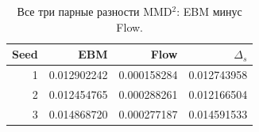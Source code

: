 \begin{table}[H]\centering\small
\setlength{\tabcolsep}{4pt}
\caption{Все три парные разности MMD$^2$: EBM минус Flow.}\label{tab:pairs}
\begin{tabular}{rrrr}
\toprule
Seed & EBM & Flow & $\Delta_s$ \\
\midrule
1 & 0.012902242 & 0.000158284 & 0.012743958 \\
2 & 0.012454765 & 0.000288261 & 0.012166504 \\
3 & 0.014868720 & 0.000277187 & 0.014591533 \\
\bottomrule
\end{tabular}
\end{table}
